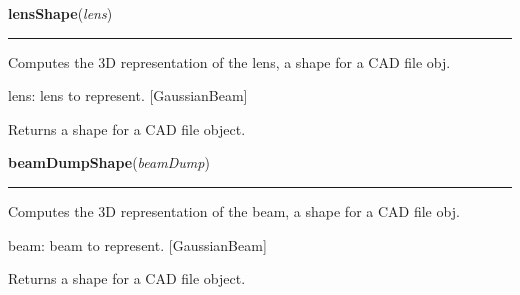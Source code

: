     \label{theia:rendering:shapes:lensShape}

    \vspace{0.5ex}

\hspace{.8\funcindent}\begin{boxedminipage}{\funcwidth}

    \raggedright \textbf{lensShape}(\textit{lens})

    \vspace{-1.5ex}

    \rule{\textwidth}{0.5\fboxrule}
\setlength{\parskip}{2ex}
    Computes the 3D representation of the lens, a shape for a CAD file obj.

    lens: lens to represent. [GaussianBeam]

    Returns a shape for a CAD file object.

\setlength{\parskip}{1ex}
    \end{boxedminipage}

    \label{theia:rendering:shapes:beamDumpShape}

    \vspace{0.5ex}

\hspace{.8\funcindent}\begin{boxedminipage}{\funcwidth}

    \raggedright \textbf{beamDumpShape}(\textit{beamDump})

    \vspace{-1.5ex}

    \rule{\textwidth}{0.5\fboxrule}
\setlength{\parskip}{2ex}
    Computes the 3D representation of the beam, a shape for a CAD file obj.

    beam: beam to represent. [GaussianBeam]

    Returns a shape for a CAD file object.

\setlength{\parskip}{1ex}
    \end{boxedminipage}

    \label{theia:rendering:shapes:ghostShape}

